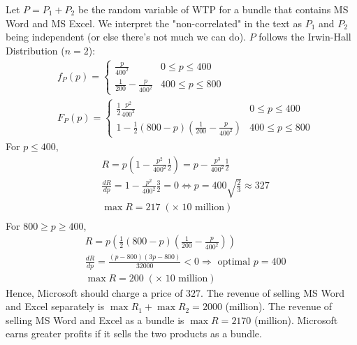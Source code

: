 \documentclass[a4paper]{article}
\begin{document}
    \begin{answer}[Q4]
    Let $P = P_1 + P_2$ be the random variable of WTP for a bundle that contains MS Word and MS Excel. We interpret the "non-correlated" in the text as $P_1$ and $P_2$ being independent (or else there's not much we can do). $P$ follows the Irwin-Hall Distribution ($n = 2$):
    \begin{align*}
        &f_P(p) = \begin{cases} \frac{p}{400^2} & 0 \leq p \leq 400 \\
                    \frac{1}{200} - \frac{p}{400^2} & 400 \leq p \leq 800\end{cases} \\
        &F_P(p) = \begin{cases} \frac{1}{2} \frac{p^2}{400^2} &0 \leq p \leq 400 \\
                1 - \frac{1}{2}(800-p)(\frac{1}{200}-\frac{p}{400^2}) & 400 \leq p \leq 800 \end{cases}
    \end{align*}
    For $p \leq 400 $,
    \begin{align*}
        &R = p (1-\frac{p^2}{400^2}\frac{1}{2}) = p -\frac{p^3}{400^2}\frac{1}{2}\\
        & \frac{dR}{dp} = 1 - \frac{p^2}{400^2}\frac{3}{2} = 0 \iff p = 400\sqrt{\frac{2}{3}} \approx 327  \\
        & \max R = 217 \; ( \times \; 10  \text{ million}) \\
    \end{align*}
    For $ 800 \geq p \geq 400$, 
    \begin{align*}
        & R = p \left(\frac{1}{2}(800-p)(\frac{1}{200}-\frac{p}{400^2})\right) \\
        & \frac{dR}{dp} = \frac{(p-800)(3p-800)}{32000} < 0 \Rightarrow \text{ optimal } p = 400 \\
        & \max R = 200 \; ( \times \; 10  \text{ million})
    \end{align*} 
    Hence, Microsoft should charge a price of $327$.
    The revenue of selling MS Word and Excel separately is 
    $\max R_1+ \max R_2 = 2000$ (million). The revenue of selling MS Word and Excel as a bundle is $\max R = 2170$ (million).
    Microsoft earns greater profits if it sells the two products as a bundle.
    
    \end{answer}
    
\end{document}
